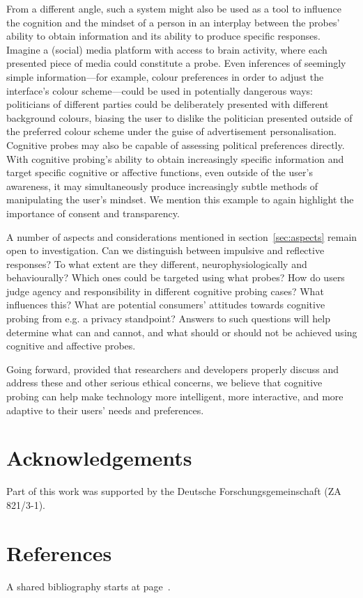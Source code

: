 From a different angle, such a system might also be used as a tool to influence the cognition and the mindset of a person in an interplay between the probes' ability to obtain information and its ability to produce specific responses. Imagine a (social) media platform with access to brain activity, where each presented piece of media could constitute a probe. Even inferences of seemingly simple information---for example, colour preferences in order to adjust the interface's colour scheme---could be used in potentially dangerous ways: politicians of different parties could be deliberately presented with different background colours, biasing the user to dislike the politician presented outside of the preferred colour scheme under the guise of advertisement personalisation. Cognitive probes may also be capable of assessing political preferences directly. With cognitive probing's ability to obtain increasingly specific information and target specific cognitive or affective functions, even outside of the user's awareness, it may simultaneously produce increasingly subtle methods of manipulating the user's mindset. We mention this example to again highlight the importance of consent and transparency.

A number of aspects and considerations mentioned in section~\ref{sec:aspects} remain open to investigation. Can we distinguish between impulsive and reflective responses? To what extent are they different, neurophysiologically and behaviourally? Which ones could be targeted using what probes? How do users judge agency and responsibility in different cognitive probing cases? What influences this? What are potential consumers' attitudes towards cognitive probing from e.g. a privacy standpoint? Answers to such questions will help determine what can and cannot, and what should or should not be achieved using cognitive and affective probes.

Going forward, provided that researchers and developers properly discuss and address these and other serious ethical concerns, we believe that cognitive probing can help make technology more intelligent, more interactive, and more adaptive to their users' needs and preferences.


\section*{Acknowledgements}

Part of this work was supported by the Deutsche Forschungsgemeinschaft (ZA 821/3-1).


\section*{References}

A shared bibliography starts at page~\pageref{bibliography}.


\clearpage
\pagestyle{plain}

